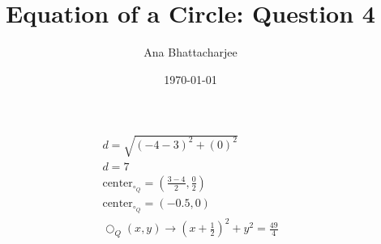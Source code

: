 \documentclass{article}
\begin{document}
\author{Ana Bhattacharjee}
\title{Equation of a Circle: Question 4}
\date{\today}
\maketitle

\begin{align}
  d = \sqrt{(-4 - 3)^2 + (0)^2} \\
  d = 7 \\
  \text{center}_{\circ_Q} = (\frac{3 - 4}{2}, \frac{0}{2}) \\
  \text{center}_{\circ_Q} = (-0.5, 0) \\
  \bigcirc_Q(x,y) \rightarrow (x + \frac{1}{2})^2 + y^2 = \frac{49}{4}
\end{align}
\end{document}
